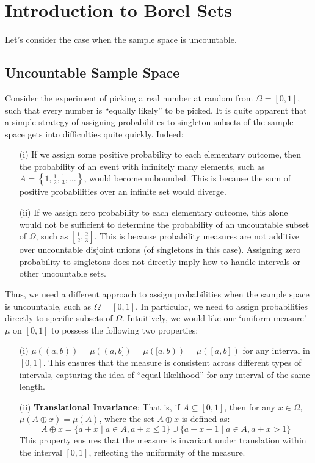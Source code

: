 \section{Introduction to Borel Sets}

Let's consider the case when the sample space is uncountable. 


\subsection{Uncountable Sample Space}

Consider the experiment of picking a real number at random from $\Omega = [0, 1]$, such that every number is “equally likely” to be picked. It is quite apparent that a simple strategy of assigning probabilities to singleton subsets of the sample space gets into difficulties quite quickly. Indeed:

\begin{enumerate}
    \item[(i)] If we assign some positive probability to each elementary outcome, then the probability of an event with infinitely many elements, such as $A = \left\{1, \frac{1}{2}, \frac{1}{3}, \ldots \right\}$, would become unbounded. This is because the sum of positive probabilities over an infinite set would diverge.

    \item[(ii)] If we assign zero probability to each elementary outcome, this alone would not be sufficient to determine the probability of an uncountable subset of $\Omega$, such as $\left[\frac{1}{2}, \frac{2}{3}\right]$. This is because probability measures are not additive over uncountable disjoint unions (of singletons in this case). Assigning zero probability to singletons does not directly imply how to handle intervals or other uncountable sets.
\end{enumerate}

Thus, we need a different approach to assign probabilities when the sample space is uncountable, such as $\Omega = [0, 1]$. In particular, we need to assign probabilities directly to specific subsets of $\Omega$. Intuitively, we would like our ‘uniform measure’ $\mu$ on $[0, 1]$ to possess the following two properties:

\begin{enumerate}
    \item[(i)] $\mu((a, b)) = \mu((a, b]) = \mu([a, b)) = \mu([a, b])$ for any interval in $[0, 1]$. This ensures that the measure is consistent across different types of intervals, capturing the idea of “equal likelihood” for any interval of the same length.
    
    \item[(ii)] \textbf{Translational Invariance}: That is, if $A \subseteq [0, 1]$, then for any $x \in \Omega$, $\mu(A \oplus x) = \mu(A)$, where the set $A \oplus x$ is defined as:
    \[
    A \oplus x = \{a + x \mid a \in A, a + x \leq 1\} \cup \{a + x - 1 \mid a \in A, a + x > 1\}
    \]
    This property ensures that the measure is invariant under translation within the interval $[0, 1]$, reflecting the uniformity of the measure.
\end{enumerate}

